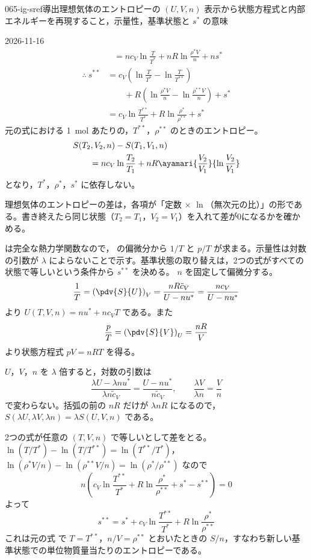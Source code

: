\documentclass[uplatex,dvipdfmx,a4paper,11pt]{jsarticle}
\begin{document}
\begin{mondai}{065-ig-sref}{導出}{理想気体のエントロピーの $(U,V,n)$ 表示から状態方程式と内部エネルギーを再現すること，示量性，基準状態と $s^{*}$ の意味}
\begin{kotaeutsushi}{2026-11-16}
\begin{align*}
&\qquad=nc_{V}\ln\frac{T}{T^{*}}+nR\ln\frac{\rho^{*}V}{n}+ns^{*}
\end{align*}
\begin{align*}
\therefore\ s^{**}&=c_{V}\left(\ln\frac{T}{T^{*}}-\ln\frac{T}{T^{**}}\right)\\
&\qquad+R\left(\ln\frac{\rho^{*}V}{n}-\ln\frac{\rho^{**}V}{n}\right)+s^{*}\\
&=c_{V}\ln\frac{T^{**}}{T^{*}}+R\ln\frac{\rho^{*}}{\rho^{**}}+s^{*}
\end{align*}
元の式における \qty{1}{\mole} あたりの，$T^{**}$，$\rho^{**}$ のときのエントロピー。
\begin{align*}
&S(T_{2},V_{2},n)-S(T_{1},V_{1},n)\\
&\qquad=nc_{V}\ln\frac{T_{2}}{T_{1}}+nR\ayamari{\frac{V_{2}}{V_{1}}}{\ln\frac{V_{2}}{V_{1}}}
\end{align*}
となり，$T^{*}$，$\rho^{*}$，$s^{*}$ に依存しない。
\end{kotaeutsushi}
\begin{kizuki}
\item 理想気体のエントロピーの差は，各項が「定数 $\times$ $\ln$（無次元の比）」の形である。書き終えたら同じ状態（$T_{2}=T_{1}$，$V_{2}=V_{1}$）を入れて差が0になるかを確かめる。
\end{kizuki}
\begin{tadashii}
\houshin {} は完全な熱力学関数なので， の偏微分から $1/T$ と $p/T$ が求まる。示量性は対数の引数が $\lambda$ によらないことで示す。基準状態の取り替えは，2つの式がすべての状態で等しいという条件から $s^{**}$ を決める。
\keisan {} $n$ を固定して偏微分する。
\[ \frac{1}{T} = \left(\pdv{S}{U}\right)_{V} = \frac{nR\tilde{c}_{V}}{U - nu^{*}} = \frac{nc_{V}}{U - nu^{*}} \]
より $U(T,V,n) = nu^{*} + nc_{V}T$ である。また
\[ \frac{p}{T} = \left(\pdv{S}{V}\right)_{U} = \frac{nR}{V} \]
より状態方程式 $pV = nRT$ を得る。

 $U$，$V$，$n$ を $\lambda$ 倍すると，対数の引数は
\[ \frac{\lambda U - \lambda nu^{*}}{\lambda n\tilde{c}_{V}} = \frac{U - nu^{*}}{n\tilde{c}_{V}}, \qquad \frac{\lambda V}{\lambda n} = \frac{V}{n} \]
で変わらない。括弧の前の $nR$ だけが $\lambda nR$ になるので，$S(\lambda U,\lambda V,\lambda n) = \lambda S(U,V,n)$ である。

 2つの式が任意の $(T,V,n)$ で等しいとして差をとる。$\ln(T/T^{*}) - \ln(T/T^{**}) = \ln(T^{**}/T^{*})$，$\ln(\rho^{*}V/n) - \ln(\rho^{**}V/n) = \ln(\rho^{*}/\rho^{**})$ なので
\[ n\left(c_{V}\ln\frac{T^{**}}{T^{*}} + R\ln\frac{\rho^{*}}{\rho^{**}} + s^{*} - s^{**}\right) = 0 \]
よって
\[ s^{**} = s^{*} + c_{V}\ln\frac{T^{**}}{T^{*}} + R\ln\frac{\rho^{*}}{\rho^{**}} \]
これは元の式  で $T = T^{**}$，$n/V = \rho^{**}$ とおいたときの $S/n$，すなわち新しい基準状態での単位物質量当たりのエントロピーである。


\end{tadashii}
\end{mondai}
\end{document}
